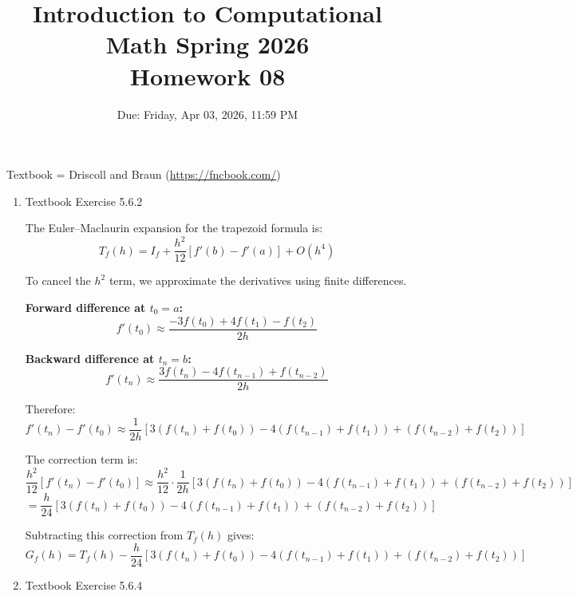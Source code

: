 \documentclass[reqno, answers]{exam}
\title{Introduction to Computational Math Spring 2026 \\ Homework 08}
\date{Due: Friday, Apr 03, 2026, 11:59 PM}
\author{}
\begin{document}
\maketitle
\thispagestyle{empty}

Textbook = Driscoll and Braun (\url{https://fncbook.com/})

\begin{enumerate}

    \item Textbook Exercise 5.6.2

          \begin{solution}
              The Euler--Maclaurin expansion for the trapezoid formula is:
              \[
                  T_f(h) = I_f + \frac{h^2}{12}[f'(b) - f'(a)] + O(h^4)
              \]

              To cancel the $h^2$ term, we approximate the derivatives using finite differences.

              \textbf{Forward difference at $t_0 = a$:}
              \[
                  f'(t_0) \approx \frac{-3f(t_0) + 4f(t_1) - f(t_2)}{2h}
              \]

              \textbf{Backward difference at $t_n = b$:}
              \[
                  f'(t_n) \approx \frac{3f(t_n) - 4f(t_{n-1}) + f(t_{n-2})}{2h}
              \]

              Therefore:
              \[
                  f'(t_n) - f'(t_0) \approx \frac{1}{2h}\left[3(f(t_n) + f(t_0)) - 4(f(t_{n-1}) + f(t_1)) + (f(t_{n-2}) + f(t_2))\right]
              \]

              The correction term is:
              \[
                  \frac{h^2}{12}[f'(t_n) - f'(t_0)] \approx \frac{h^2}{12} \cdot \frac{1}{2h}\left[3(f(t_n) + f(t_0)) - 4(f(t_{n-1}) + f(t_1)) + (f(t_{n-2}) + f(t_2))\right]
              \]
              \[
                  = \frac{h}{24}\left[3(f(t_n) + f(t_0)) - 4(f(t_{n-1}) + f(t_1)) + (f(t_{n-2}) + f(t_2))\right]
              \]

              Subtracting this correction from $T_f(h)$ gives:
              \[
                  G_f(h) = T_f(h) - \frac{h}{24}\left[3(f(t_n) + f(t_0)) - 4(f(t_{n-1}) + f(t_1)) + (f(t_{n-2}) + f(t_2))\right]
              \]\end{solution}

    \item Textbook Exercise 5.6.4

          \begin{solution}


\end{solution}
\end{enumerate}
\end{document}
